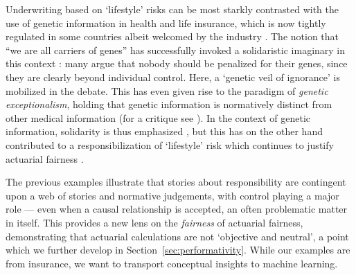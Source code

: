 \documentclass[11pt]{article} %
\begin{document}
Underwriting based on `lifestyle' risks can be most starkly contrasted with the use of genetic information in health and life insurance, which is now tightly regulated in some countries \citep{van2018genomics} albeit welcomed by the industry \citep{rechfeld2016personalised}. The notion that ``we are all carriers of genes'' has successfully invoked a solidaristic imaginary in this context \citep{van2007genetic}: many argue that nobody should be penalized for their genes, since they are clearly beyond individual control. Here, a `genetic veil of ignorance' is mobilized in the debate. This has even given rise to the paradigm of \textit{genetic exceptionalism}, holding that genetic information is normatively distinct from other medical information (for a critique see \citep{lippert2015genetic}). In the context of genetic information, solidarity is thus emphasized \citep{liukko2010genetic}, but this has on the other hand contributed to a responsibilization of `lifestyle' risk which continues to justify actuarial fairness \citep{van2018genomics}. 

The previous examples illustrate that stories about responsibility are contingent upon a web of stories and normative judgements, with control playing a major role --- even when a causal relationship is accepted, an often problematic matter in itself. This provides a new lens on the \textit{fairness} of actuarial fairness, demonstrating that actuarial calculations are not `objective and neutral', a point which we further develop in Section~\ref{sec:performativity}.
While our examples are from insurance, we want to transport conceptual insights to machine learning.
\end{document}
